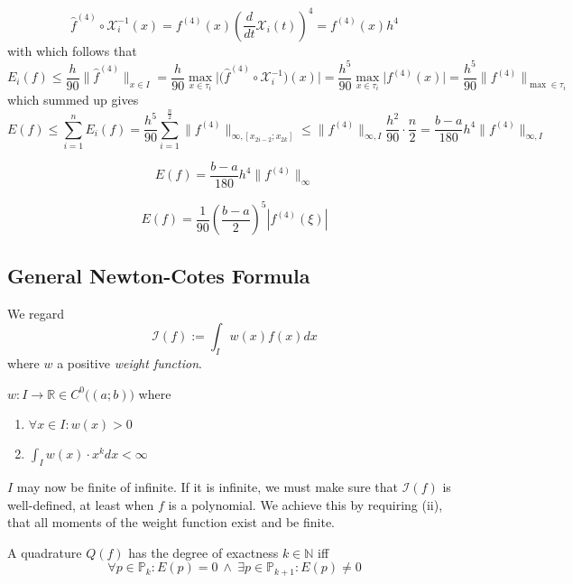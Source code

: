 \[\hat{f}^{(4)} \circ \mathcal{X}_i^{-1}(x) = f^{(4)}(x) \left(\frac{d}{dt} \mathcal{X}_i(t)\right)^4 = f^{(4)}(x)h^4\]
with which follows that
\[E_i(f) \leq \frac{h}{90} \|\hat{f}^{(4)}\|_{x \in I} = \frac{h}{90} \max_{x \in \tau_i}\Big|\big(\hat{f}^{(4)} \circ \mathcal{X}_i^{-1}\big)(x)\Big| = \frac{h^5}{90} \max_{x \in \tau_i} \Big|f^{(4)}(x)\Big| = \frac{h^5}{90} \Big\|f^{(4)}\Big\|_{\max \in \tau_i}\]
which summed up gives
\[E(f) \leq \sum_{i=1}^n E_i(f) = \frac{h^5}{90} \sum_{i=1}^\frac{n}{2} \Big\|f^{(4)}\Big\|_{\infty, [x_{2i-2}; x_{2k}]} \leq \|f^{(4)}\|_{\infty, I} \frac{h^2}{90} \cdot \frac{n}{2} = \frac{b-a}{180}h^4\|f^{(4)}\|_{\infty, I}\]
\begin{definition}
   \[E(f) = \frac{b-a}{180}h^4\|f^{(4)}\|_\infty\]
\end{definition}

\begin{definition}
   \[E(f) = \frac{1}{90} \left(\frac{b-a}{2}\right)^5 |f^{(4)}(\xi)|\]
\end{definition}

\subsection{General Newton-Cotes Formula}
We regard
\[\mathcal{I}(f) := \int_I w(x)f(x) dx\]
where \(w\) a positive \emph{weight function}.

\begin{definition}
   \(w: I \to \mathbb{R} \in C^0\big((a; b)\big)\) where
   \begin{enumerate}[label=\roman*, align=Center]
      \item \(\forall x \in I: w(x) > 0\)
      \item \(\int_I w(x) \cdot x^k dx < \infty\)
   \end{enumerate}
\end{definition}
\begin{remark}
   \(I\) may now be finite of infinite.
   If it is infinite, we must make sure that \(\mathcal{I}(f)\) is well-defined, at least when \(f\) is a polynomial.
   We achieve this by requiring (ii), that all moments of the weight function exist and be finite.
\end{remark}

\begin{definition}
   A quadrature \(Q(f)\) has the degree of exactness \(k \in \mathbb{N}\) iff
   \[\forall p \in \mathbb{P}_k: E(p) = 0~\land~\exists p \in \mathbb{P}_{k+1}: E(p) \neq 0\]
\end{definition}

